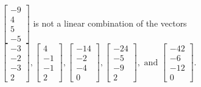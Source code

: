 \begin{exercise}
\begin{exerciseStatement}
  \end{exerciseStatement}
  \begin{exerciseAnswer}
   \(\left[\begin{array}{c}
-9 \\
4 \\
5 \\
-5
\end{array}\right]\) 
  	 is not  
	a linear combination of the vectors \(\left[\begin{array}{c}
-3 \\
-2 \\
-3 \\
2
\end{array}\right] , \left[\begin{array}{c}
4 \\
-1 \\
-1 \\
2
\end{array}\right] , \left[\begin{array}{c}
-14 \\
-2 \\
-4 \\
0
\end{array}\right] , \left[\begin{array}{c}
-24 \\
-5 \\
-9 \\
2
\end{array}\right] , \text{ and } \left[\begin{array}{c}
-42 \\
-6 \\
-12 \\
0
\end{array}\right]\).

	
  


  \end{exerciseAnswer}
\end{exercise}